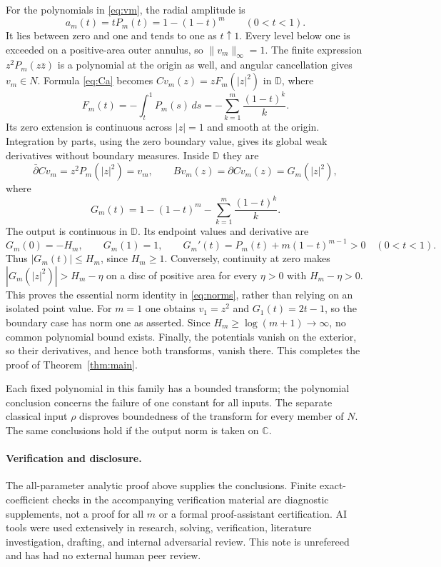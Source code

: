 \documentclass[10pt]{article}
\newcommand{\C}{\mathbb C}
\newcommand{\D}{\mathbb D}
\newcommand{\dbar}{\bar\partial}
\begin{document}
For the polynomials in \eqref{eq:vm}, the radial amplitude is
\[
 a_m(t)=tP_m(t)=1-(1-t)^m\qquad(0<t<1).
\]
It lies between zero and one and tends to one as $t\uparrow1$.
Every level below one is exceeded on a positive-area outer annulus,
so $\|v_m\|_\infty=1$. The finite expression $z^2P_m(z\bar z)$
is a polynomial at the origin as well, and angular cancellation gives
$v_m\in N$.
Formula \eqref{eq:Ca} becomes $Cv_m(z)=zF_m(|z|^2)$ in $\D$, where
\begin{equation}\label{eq:F}
 F_m(t)=-\int_t^1P_m(s)\,ds
       =-\sum_{k=1}^m\frac{(1-t)^k}{k}.
\end{equation}
Its zero extension is continuous across $|z|=1$ and smooth at the
origin. Integration by parts, using the zero boundary value, gives its
global weak derivatives without boundary measures. Inside $\D$ they are
\[
 \dbar Cv_m=z^2P_m(|z|^2)=v_m,\qquad
 Bv_m(z)=\partial Cv_m(z)=G_m(|z|^2),
\]
where
\begin{equation}\label{eq:G}
 G_m(t)=1-(1-t)^m-\sum_{k=1}^m\frac{(1-t)^k}{k}.
\end{equation}
The output is continuous in $\D$. Its endpoint values and derivative are
\[
 G_m(0)=-H_m,\qquad G_m(1)=1,\qquad
 G_m'(t)=P_m(t)+m(1-t)^{m-1}>0\quad(0<t<1).
\]
Thus $|G_m(t)|\le H_m$, since $H_m\ge1$. Conversely, continuity at
zero makes $|G_m(|z|^2)|>H_m-\eta$ on a disc of positive area for
every $\eta>0$ with $H_m-\eta>0$. This proves the essential norm
identity in \eqref{eq:norms}, rather than relying on an isolated point
value. For $m=1$ one obtains $v_1=z^2$ and $G_1(t)=2t-1$, so the
boundary case has norm one as asserted. Since
$H_m\ge\log(m+1)\to\infty$, no common polynomial bound exists.
Finally, the potentials vanish on the exterior, so their derivatives,
and hence both transforms, vanish there. This completes the proof of
Theorem~\ref{thm:main}.

Each fixed polynomial in this family has a bounded transform; the
polynomial conclusion concerns the failure of one constant for all
inputs. The separate classical input $\rho$ disproves boundedness of
the transform for every member of $N$. The same conclusions hold if
the output norm is taken on $\C$.

\paragraph{Verification and disclosure.}
The all-parameter analytic proof above supplies the conclusions.
Finite exact-coefficient checks in the accompanying verification
material are diagnostic supplements, not a proof for all $m$ or a
formal proof-assistant certification. AI tools were used extensively
in research, solving, verification, literature investigation, drafting,
and internal adversarial review. This note is unrefereed and has had
no external human peer review.
\end{document}
